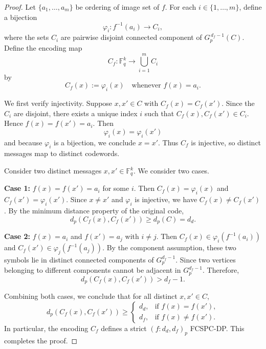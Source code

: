 \documentclass[11pt,draftclsnofoot,journal,onecolumn]{IEEEtran}
\begin{document}
    \begin{proof}
    Let \(\{a_1,\dots,a_m\}\) be ordering of image set  of $f$. For each \(i\in\{1,\dots,m\}\), define a bijection  
    \[
    \varphi_i : f^{-1}(a_i) \longrightarrow C_i,
    \]
    where the sets \(C_i\) are pairwise disjoint connected component of $G_p^{\,d_f-1}(C)$. Define the encoding map  
    \[
    C_f:\mathbb{F}_q^k \longrightarrow \bigcup_{i=1}^m C_i
    \]
    by  
    \[
    C_f(x) := \varphi_i(x) \quad \text{whenever } f(x)=a_i.
    \]

    We first verify injectivity. Suppose \(x,x'\in C\) with \(C_f(x)=C_f(x')\).  Since the \(C_i\) are disjoint, there exists a unique index \(i\) such that \(C_f(x),C_f(x')\in C_i\). Hence \(f(x)=f(x')=a_i\). Then  
    \[
    \varphi_i(x)=\varphi_i(x')
    \]
    and because \(\varphi_i\) is a bijection, we conclude \(x=x'\).  Thus \(C_f\) is injective, so distinct messages map to distinct codewords.

    Consider two distinct messages \(x,x'\in \mathbb{F}_q^k\). We consider two cases.

    \medskip
    \noindent
    \textbf{Case 1:} \(f(x)=f(x')=a_i\) for some \(i\).  Then \(C_f(x)=\varphi_i(x)\) and \(C_f(x')=\varphi_i(x')\).  Since \(x\neq x'\) and \(\varphi_i\) is injective, we have \(C_f(x)\neq C_f(x')\).  By the minimum distance property of the original code,  
    \[
    d_p(C_f(x),C_f(x')) \ge d_p(C) = d_d.
    \]

    \medskip
    \noindent
    \textbf{Case 2:} \(f(x)=a_i\) and \(f(x')=a_j\) with \(i\neq j\). Then \(C_f(x)\in \varphi_i(f^{-1}(a_i))\) and \(C_f(x')\in \varphi_j(f^{-1}(a_j))\).  By the component assumption, these two symbols lie in distinct connected components  of \(G_p^{d_f-1}\). Since two vertices belonging to different components cannot be adjacent in \(G_p^{d_f-1}\). Therefore, 
    \[
    d_p(C_f(x),C_f(x')) > d_f-1.
    \]

    Combining both cases, we conclude that for all distinct \(x,x'\in C\),
    \[
    d_p(C_f(x),C_f(x')) \ge 
    \begin{cases}
        d_d, & \text{if } f(x)=f(x'),\\[4pt]
        d_f, & \text{if } f(x)\neq f(x').
    \end{cases}
    \]
    In particular, the encoding \(C_f\) defines a strict $(f: d_d, d_f)_p$ FCSPC-DP. This completes the proof.
    \end{proof}
\end{document}
